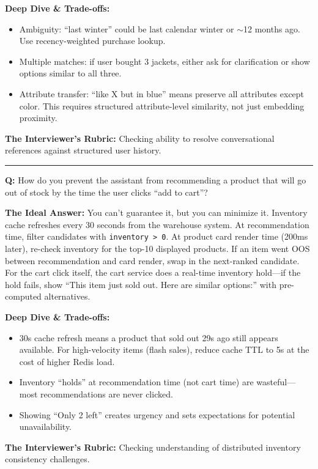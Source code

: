 \textbf{Deep Dive \& Trade-offs:}
\begin{itemize}
  \item Ambiguity: ``last winter'' could be last calendar winter or $\sim$12 months ago. Use recency-weighted purchase lookup.
  \item Multiple matches: if user bought 3 jackets, either ask for clarification or show options similar to all three.
  \item Attribute transfer: ``like X but in blue'' means preserve all attributes except color. This requires structured attribute-level similarity, not just embedding proximity.
\end{itemize}

\textbf{The Interviewer's Rubric:} Checking ability to resolve conversational references against structured user history.

\bigskip\hrule\bigskip

\textbf{Q:} How do you prevent the assistant from recommending a product that will go out of stock by the time the user clicks ``add to cart''?

\textbf{The Ideal Answer:} You can't guarantee it, but you can minimize it. Inventory cache refreshes every 30 seconds from the warehouse system. At recommendation time, filter candidates with \texttt{inventory > 0}. At product card render time (200ms later), re-check inventory for the top-10 displayed products. If an item went OOS between recommendation and card render, swap in the next-ranked candidate. For the cart click itself, the cart service does a real-time inventory hold---if the hold fails, show ``This item just sold out. Here are similar options:'' with pre-computed alternatives.

\textbf{Deep Dive \& Trade-offs:}
\begin{itemize}
  \item 30s cache refresh means a product that sold out 29s ago still appears available. For high-velocity items (flash sales), reduce cache TTL to 5s at the cost of higher Redis load.
  \item Inventory ``holds'' at recommendation time (not cart time) are wasteful---most recommendations are never clicked.
  \item Showing ``Only 2 left'' creates urgency and sets expectations for potential unavailability.
\end{itemize}

\textbf{The Interviewer's Rubric:} Checking understanding of distributed inventory consistency challenges.

